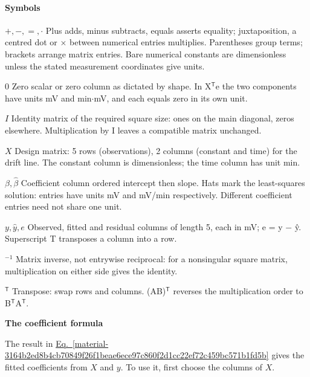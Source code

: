 \documentclass[11pt,a4paper]{article}
\begin{document}
\paragraph{Symbols}
\par\noindent\textbf{\(+,-,=,\cdot\)} Plus adds, minus subtracts, equals asserts equality; juxtaposition, a centred dot or \ensuremath{\times} between numerical entries multiplies. Parentheses group terms; brackets arrange matrix entries. Bare numerical constants are dimensionless unless the stated measurement coordinates give units.
\par\noindent\textbf{\(0\)} Zero scalar or zero column as dictated by shape. In X\ensuremath{{}^{\mathsf T}}e the two components have units mV and min\ensuremath{\cdot}mV, and each equals zero in its own unit.
\par\noindent\textbf{\(I\)} Identity matrix of the required square size: ones on the main diagonal, zeros elsewhere. Multiplication by I leaves a compatible matrix unchanged.
\par\noindent\textbf{\(X\)} Design matrix: 5 rows (observations), 2 columns (constant and time) for the drift line. The constant column is dimensionless; the time column has unit min.
\par\noindent\textbf{\(\beta,\widehat\beta\)} Coefficient column ordered intercept then slope. Hats mark the least-squares solution: entries have units mV and mV/min respectively. Different coefficient entries need not share one unit.
\par\noindent\textbf{\(y,\widehat y,e\)} Observed, fitted and residual columns of length 5, each in mV; e = y \ensuremath{-} ŷ. Superscript T transposes a column into a row.
\par\noindent\textbf{\({}^{-1}\)} Matrix inverse, not entrywise reciprocal: for a nonsingular square matrix, multiplication on either side gives the identity.
\par\noindent\textbf{\({}^{\mathsf T}\)} Transpose: swap rows and columns. (AB)\ensuremath{{}^{\mathsf T}} reverses the multiplication order to B\ensuremath{{}^{\mathsf T}}A\ensuremath{{}^{\mathsf T}}.
\medskip

\textbf{The coefficient formula}


The result in \hyperref[material-3164b2ed8b4cb70849f26f1beae6ece97c860f2d1cc22ef72c459bc571b1fd5b]{Eq.~\ref*{material-3164b2ed8b4cb70849f26f1beae6ece97c860f2d1cc22ef72c459bc571b1fd5b}} gives the fitted coefficients from \(X\) and \(y\). To use it, first choose the columns of \(X\).
\end{document}
